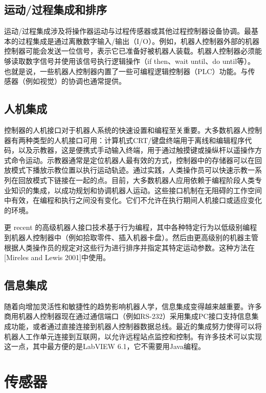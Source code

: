 \documentclass[UTF8,a4paper]{ctexart}
\begin{document}
\subsection{运动/过程集成和排序}

运动/过程集成涉及将操作器运动与过程传感器或其他过程控制器设备协调。最基本的过程集成是通过离散数字输入/输出（I/O）。例如，机器人控制器外部的机器控制器可能会发送一位信号，表示它已准备好被机器人装载。机器人控制器必须能够读取数字信号并使用该信号执行逻辑操作（if then、wait until、do until等）。也就是说，一些机器人控制器内置了一些可编程逻辑控制器（PLC）功能。与传感器（例如视觉）的协调也通常提供。

\subsection{人机集成}

控制器的人机接口对于机器人系统的快速设置和编程至关重要。大多数机器人控制器有两种类型的人机接口可用：计算机式CRT/键盘终端用于离线和编辑程序代码，以及示教器，这是便携式手动输入终端，用于通过触摸键或操纵杆以遥操作方式命令运动。示教器通常是定位机器人最有效的方式，控制器中的存储器可以在回放模式下播放示教位置以执行运动轨迹。通过实践，人类操作员可以快速示教一系列在回放模式下链接在一起的点。目前，大多数机器人应用依赖于编程阶段人类专业知识的集成，以成功规划和协调机器人运动。这些接口机制在无阻碍的工作空间中有效，在编程和执行之间没有变化。它们不允许在执行期间人机接口或适应变化的环境。

更 recent 的高级机器人接口技术基于行为编程，其中各种特定行为以低级别编程到机器人控制器中（例如拾取零件、插入机器卡盘）。然后由更高级别的机器主管根据人类操作员的规定对这些行为进行排序并指定其特定运动参数。这种方法在[Mireles and Lewis 2001]中使用。

\subsection{信息集成}

随着向增加灵活性和敏捷性的趋势影响机器人学，信息集成变得越来越重要。许多商用机器人控制器现在通过通信端口（例如RS-232）采用集成PC接口支持信息集成功能，或者通过直接连接到机器人控制器数据总线。最近的集成努力使得可以将机器人工作单元连接到互联网，以允许远程站点监控和控制。有许多技术可以实现这一点，其中最方便的是LabVIEW 6.1，它不需要用Java编程。

\section{传感器}
\end{document}
